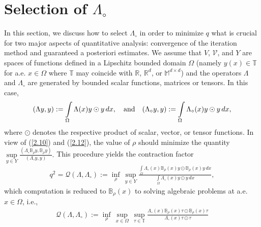 \documentclass[amstex,amstext,amsfonts,epsf,12pt] {amsart}
\newcommand\be{\begin{eqnarray*}}
\newcommand\ee{\end{eqnarray*}}
\newcommand\ben{\begin{eqnarray}}
\newcommand\een{\end{eqnarray}}
\def\be{\begin{eqnarray*}}
\def\ee{\end{eqnarray*}}
\def\ben{\begin{eqnarray}}
\def\een{\end{eqnarray}}
\def\IntO{\int\limits_\Omega}
\def\Md{{\mathbb M}^{d\times d}}
\def\cV{{\mathcal V}}
\begin{document}
\section{Selection of $\Lambda_\circ$}
In this section, we discuss how to select $\Lambda_\circ$
in order to minimize $q$ what is crucial for two major aspects
of quantitative analysis: convergence of the iteration method
and guaranteed a posteriori estimates. We assume that $V$, $\cV$, and $Y$ are spaces
of functions defined in a Lipschitz bounded domain $\Omega$
(namely $y(x)\in \mathbb T$ for a.e. $x\in \Omega$ where $\mathbb T$ may coincide
with $\mathbb R$, ${\mathbb R}^d$, or $\Md$)
and the operators $\Lambda$ and $\Lambda_\circ$ are generated by bounded
scalar functions, matrices or tensors. In this case,
\be 
(\Lambda y,y):=\IntO \Lambda(x) y\odot y\,dx,\quad
{\rm and}\quad
(\Lambda_\circ y,y):=\IntO \Lambda_\circ(x) y\odot y\,dx,
\ee
where $\odot$ denotes the respective product of scalar, vector, or tensor
functions.
In view of (\ref{2.10}) and (\ref{2.12}), the value of $\rho$ should minimize
 the quantity
$
\sup\limits_{y\in Y}
\frac{(\Lambda_\circ {\mathbb B}_\rho y,{\mathbb B}_\rho y)}{(\Lambda_\circ y,y)}.
$
This procedure yields the contraction factor
\ben
\label{3.1}
q^2={\mathcal Q}(\Lambda,\Lambda_\circ):=\inf\limits_{\rho}\,\sup\limits_{y\in Y}
\frac{\IntO \Lambda_\circ(x) {\mathbb B}_\rho(x) y\odot 
{\mathbb B}_\rho (x) y\,dx}{\IntO \Lambda_\circ(x) y\odot y\,dx},
\een
which computation is reduced to  ${\mathbb B}_\rho(x)$  to solving
algebraic problems at a.e. $x\in \Omega$, i.e.,
 \ben
 \label{3.2}
{\mathcal Q}(\Lambda,\Lambda_\circ):=\inf\limits_{\rho}\,\sup\limits_{x\in \Omega}\,\sup\limits_{\tau\in {\mathbb T}}
\frac{\Lambda_\circ(x) {\mathbb B}_\rho(x) \tau\odot 
{\mathbb B}_\rho (x) \tau}{ \Lambda_\circ(x) \tau\odot \tau}
\een


\end{document}
